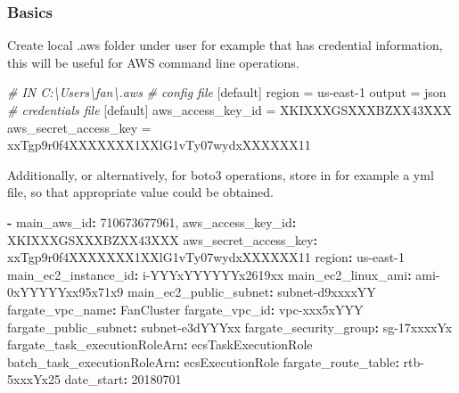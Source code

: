 \documentclass[
]{book}
\newenvironment{Shaded}{\begin{snugshade}}{\end{snugshade}}
\newcommand{\AttributeTok}[1]{\textcolor[rgb]{0.77,0.63,0.00}{#1}}
\newcommand{\CommentTok}[1]{\textcolor[rgb]{0.56,0.35,0.01}{\textit{#1}}}
\newcommand{\DecValTok}[1]{\textcolor[rgb]{0.00,0.00,0.81}{#1}}
\newcommand{\ExtensionTok}[1]{#1}
\newcommand{\FunctionTok}[1]{\textcolor[rgb]{0.00,0.00,0.00}{#1}}
\newcommand{\KeywordTok}[1]{\textcolor[rgb]{0.13,0.29,0.53}{\textbf{#1}}}
\newcommand{\NormalTok}[1]{#1}
\begin{document}
\hypertarget{basics}{%
\subsubsection{Basics}\label{basics}}

Create local .aws folder under user for example that has credential information, this will be useful for AWS command line operations.

\begin{Shaded}
\begin{Highlighting}[]
\CommentTok{\# IN C:\textbackslash{}Users\textbackslash{}fan\textbackslash{}.aws}
\CommentTok{\# config file}
\NormalTok{[}\ExtensionTok{default}\NormalTok{]}
\ExtensionTok{region}\NormalTok{ = us{-}east{-}1}
\ExtensionTok{output}\NormalTok{ = json}
\CommentTok{\# credentials file}
\NormalTok{[}\ExtensionTok{default}\NormalTok{]}
\ExtensionTok{aws\_access\_key\_id}\NormalTok{ = XKIXXXGSXXXBZXX43XXX}
\ExtensionTok{aws\_secret\_access\_key}\NormalTok{ = xxTgp9r0f4XXXXXXX1XXlG1vTy07wydxXXXXXX11}
\end{Highlighting}
\end{Shaded}

Additionally, or alternatively, for boto3 operations, store in for example a yml file, so that appropriate value could be obtained.

\begin{Shaded}
\begin{Highlighting}[]
\KeywordTok{{-}}\AttributeTok{ }\FunctionTok{main\_aws\_id}\KeywordTok{:}\AttributeTok{ 710673677961,}
\AttributeTok{  }\FunctionTok{aws\_access\_key\_id}\KeywordTok{:}\AttributeTok{ XKIXXXGSXXXBZXX43XXX}
\AttributeTok{  }\FunctionTok{aws\_secret\_access\_key}\KeywordTok{:}\AttributeTok{ xxTgp9r0f4XXXXXXX1XXlG1vTy07wydxXXXXXX11}
\AttributeTok{  }\FunctionTok{region}\KeywordTok{:}\AttributeTok{ us{-}east{-}1}
\AttributeTok{  }\FunctionTok{main\_ec2\_instance\_id}\KeywordTok{:}\AttributeTok{ i{-}YYYxYYYYYYx2619xx}
\AttributeTok{  }\FunctionTok{main\_ec2\_linux\_ami}\KeywordTok{:}\AttributeTok{ ami{-}0xYYYYYxx95x71x9}
\AttributeTok{  }\FunctionTok{main\_ec2\_public\_subnet}\KeywordTok{:}\AttributeTok{ subnet{-}d9xxxxYY}
\AttributeTok{  }\FunctionTok{fargate\_vpc\_name}\KeywordTok{:}\AttributeTok{ FanCluster}
\AttributeTok{  }\FunctionTok{fargate\_vpc\_id}\KeywordTok{:}\AttributeTok{ vpc{-}xxx5xYYY}
\AttributeTok{  }\FunctionTok{fargate\_public\_subnet}\KeywordTok{:}\AttributeTok{ subnet{-}e3dYYYxx}
\AttributeTok{  }\FunctionTok{fargate\_security\_group}\KeywordTok{:}\AttributeTok{ sg{-}17xxxxYx}
\AttributeTok{  }\FunctionTok{fargate\_task\_executionRoleArn}\KeywordTok{:}\AttributeTok{ ecsTaskExecutionRole}
\AttributeTok{  }\FunctionTok{batch\_task\_executionRoleArn}\KeywordTok{:}\AttributeTok{ ecsExecutionRole}
\AttributeTok{  }\FunctionTok{fargate\_route\_table}\KeywordTok{:}\AttributeTok{ rtb{-}5xxxYx25}
\AttributeTok{  }\FunctionTok{date\_start}\KeywordTok{:}\AttributeTok{ }\DecValTok{20180701}
\end{Highlighting}
\end{Shaded}
\end{document}
